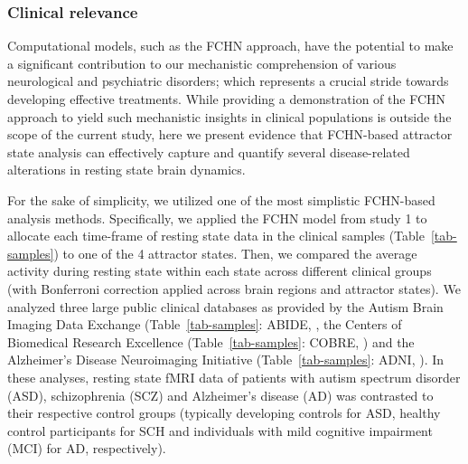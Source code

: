 \documentclass{article}
\begin{document}
\subsubsection{Clinical relevance}\label{Clinical relevance}

Computational models, such as the FCHN approach, have the potential to make a significant contribution to our mechanistic comprehension of various neurological and psychiatric disorders; which represents a crucial stride towards developing effective treatments. While providing a demonstration of the FCHN approach to yield such mechanistic insights in clinical populations is outside the scope of the current study, here we present evidence that FCHN-based attractor state analysis can effectively capture and quantify several disease-related alterations in resting state brain dynamics.

For the sake of simplicity, we utilized one of the most simplistic FCHN-based analysis methods. Specifically, we applied the FCHN model from study 1 to allocate each time-frame of resting state data in the clinical samples (Table~\ref{tab-samples}) to one of the 4 attractor states. Then, we compared the average activity during resting state within each state across different clinical groups (with Bonferroni correction applied across brain regions and attractor states). We analyzed three large public clinical databases as provided by the Autism Brain Imaging Data Exchange
(Table~\ref{tab-samples}: ABIDE, \citep{di2014autism}, the Centers of Biomedical Research Excellence
(Table~\ref{tab-samples}: COBRE, \citep{aine2017multimodal}) and the Alzheimer's Disease Neuroimaging Initiative
(Table~\ref{tab-samples}: ADNI, \citep{petersen2010alzheimer}).
In these analyses, resting state fMRI data of patients with autism spectrum disorder (ASD), schizophrenia (SCZ) and Alzheimer's disease
(AD) was contrasted to their respective control groups (typically developing controls for ASD, healthy control
participants for SCH and individuals with mild cognitive impairment (MCI) for AD, respectively).
\end{document}
